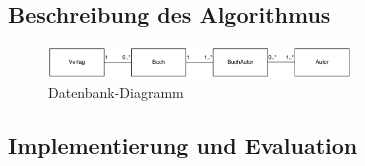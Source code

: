 	\subsection{Beschreibung des Algorithmus}
	
	\begin{figure}[htb]
		\begin{center}
			\includegraphics[width=8cm]{images/database.png}
			\caption{\label{database}Datenbank-Diagramm}
		\end{center}
	\end{figure}
	

	

	\subsection{Implementierung und Evaluation}

